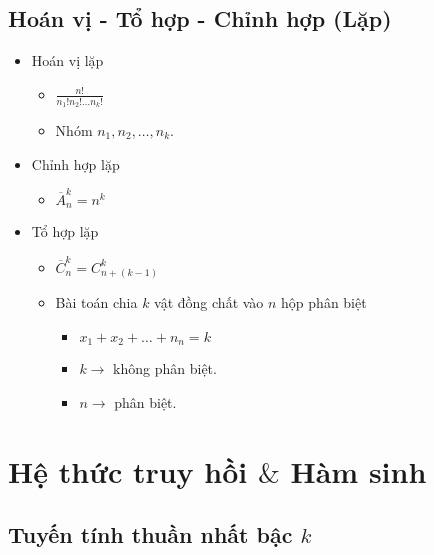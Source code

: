 \documentclass[11pt]{article}
\providecommand{\tightlist}{%
      \setlength{\itemsep}{0pt}\setlength{\parskip}{0pt}}
\begin{document}
    \subsection{Hoán vị - Tổ hợp - Chỉnh hợp
(Lặp)}\label{houxe1n-vux1ecb---tux1ed5-hux1ee3p---chux1ec9nh-hux1ee3p-lux1eb7p}

    \begin{itemize}
\item
  Hoán vị lặp

  \begin{itemize}
  \item
    \(\frac{n!}{n_1!n_2!\ldots n_k!}\)
  \item
    Nhóm \(n_1, n_2, \ldots , n_k\).
  \end{itemize}
\item
  Chỉnh hợp lặp

  \begin{itemize}
  \tightlist
  \item
    \(\overline{A}_n^k = n^k\)
  \end{itemize}
\item
  Tổ hợp lặp

  \begin{itemize}
  \item
    \(\overline{C}_n^k = C_{n+(k-1)}^k\)
  \item
    Bài toán chia \(k\) vật đồng chất vào \(n\) hộp phân biệt

    \begin{itemize}
    \item
      \(x_1+x_2+\ldots + n_n=k\)
    \item
      \(k \to\) không phân biệt.
    \item
      \(n \to\) phân biệt.
    \end{itemize}
  \end{itemize}
\end{itemize}

    \section{\texorpdfstring{Hệ thức truy hồi \(\&\) Hàm
sinh}{Hệ thức truy hồi \textbackslash\& Hàm sinh}}\label{hux1ec7-thux1ee9c-truy-hux1ed3i-huxe0m-sinh}

    \subsection{\texorpdfstring{Tuyến tính thuần nhất bậc
\(k\)}{Tuyến tính thuần nhất bậc k}}\label{tuyux1ebfn-tuxednh-thuux1ea7n-nhux1ea5t-bux1eadc-k}
\end{document}
